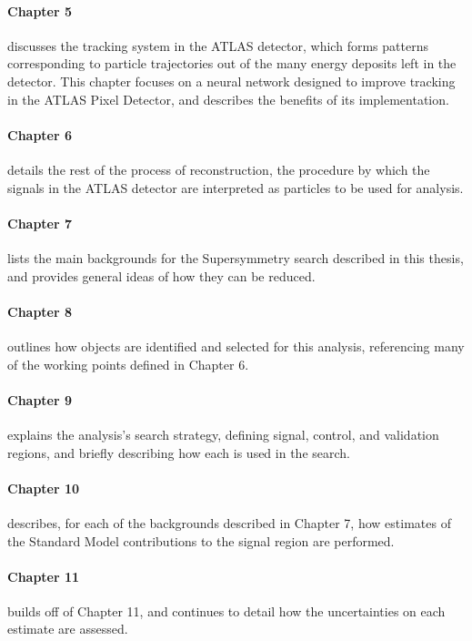 \paragraph{Chapter 5} discusses the tracking system in the \ac{ATLAS} detector, which forms patterns corresponding to particle trajectories out of the many energy deposits left in the detector. This chapter focuses on a neural network designed to improve tracking in the \ac{ATLAS} Pixel Detector, and describes the benefits of its implementation. 

\paragraph{Chapter 6} details the rest of the process of reconstruction, the procedure by which the signals in the \ac{ATLAS} detector are interpreted as particles to be used for analysis. 

\paragraph{Chapter 7} lists the main backgrounds for the Supersymmetry search described in this thesis, and provides general ideas of how they can be reduced. 

\paragraph{Chapter 8} outlines how objects are identified and selected for this analysis, referencing many of the working points defined in Chapter 6.  

\paragraph{Chapter 9} explains the analysis's search strategy, defining signal, control, and validation regions, and briefly describing how each is used in the search.

\paragraph{Chapter 10} describes, for each of the backgrounds described in Chapter 7, how estimates of the Standard Model contributions to the signal region are performed. 

\paragraph{Chapter 11} builds off of Chapter 11, and continues to detail how the uncertainties on each estimate are assessed. 

